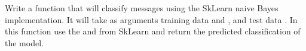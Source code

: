 \begin{problem}\label{prob:naivebayes:sklearn}
Write a function that will classify messages using the SkLearn naive Bayes implementation. 
It will take as arguments training data  and , and test data . 
In this function use the  and  from SkLearn and return the predicted classification of the model.
\end{problem}
